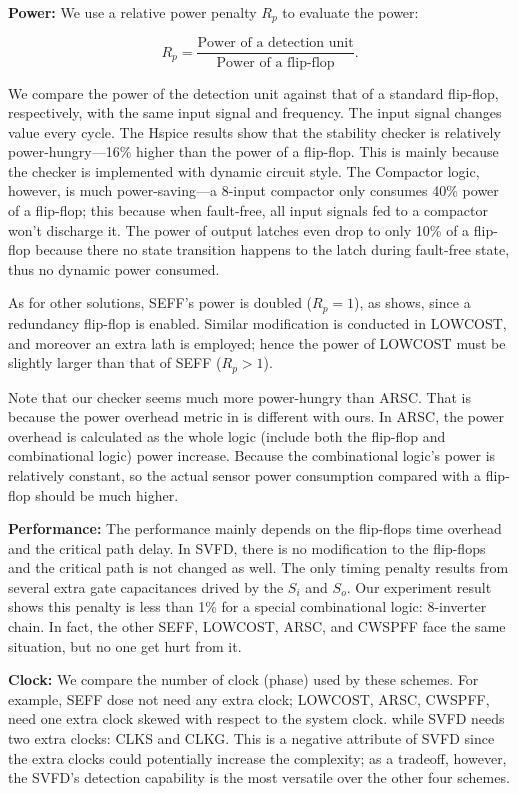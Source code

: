 {\bf Power:} We use a relative power penalty $R_p$ to evaluate the power:

\begin{equation}
  R_p=\frac{\mbox{Power of a detection unit}}{\mbox{Power of a flip-flop}}.
\end{equation}

We compare the power of the detection unit against that of a standard flip-flop, respectively, with the same input signal and frequency. The input signal changes value every cycle. The Hspice results show that the stability checker is relatively power-hungry---16\% higher than the power of a flip-flop.  This is mainly because the checker is implemented with dynamic circuit style. The Compactor logic, however, is much power-saving---a 8-input compactor only consumes 40\% power of a flip-flop; this because when fault-free, all input signals fed to a compactor won't discharge it. The power of output latches even drop to only 10\% of a flip-flop because there no state transition happens to the latch during fault-free state, thus no dynamic power consumed.

As for other solutions,  SEFF's power is doubled ($R_p=1$), as \cite{Mitra_C05} shows, since a redundancy flip-flop is enabled. Similar modification is conducted in LOWCOST, and moreover an extra lath is employed; hence the power of LOWCOST must be slightly larger than that of SEFF ($R_p>1$).

Note that our checker seems much more power-hungry than ARSC. That is because the power overhead metric in \cite{failure_prediction_07} is different with ours. In ARSC, the power overhead is calculated as the whole logic (include both the flip-flop and combinational logic) power increase. Because the combinational logic's power is relatively constant, so the actual sensor power consumption compared with a flip-flop should be much higher.

{\bf Performance:} The performance mainly depends on the flip-flops time overhead and the critical path delay. In SVFD, there is no modification to the flip-flops and the critical path is not changed as well. The only timing penalty results from several extra gate capacitances drived by the $S_i$ and $S_o$. Our experiment result shows this penalty is less than 1\% for a special combinational logic: 8-inverter chain.  In fact, the other SEFF, LOWCOST, ARSC, and CWSPFF face the same situation, but no one get hurt from it.

{\bf Clock:} We compare the number of clock (phase) used by these schemes. For example, SEFF dose not need any extra clock; LOWCOST, ARSC, CWSPFF, need one extra clock skewed with respect to the system clock. while SVFD needs two extra clocks: CLKS and CLKG. This is a negative attribute of SVFD since the extra clocks could potentially increase the complexity; as a tradeoff, however, the SVFD's detection capability is the most versatile over the other four schemes.

